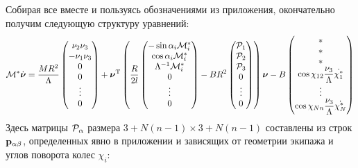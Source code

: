 Собирая все вместе и пользуясь обозначениями из приложения, окончательно получим следующую структуру уравнений:
\begin{eqnarray}\label{eq:full_system}
\mathcal{M}^*\dot{\boldsymbol{\mathbf{\nu}}} = 
\frac{MR^2}{\Lambda}\left(\begin{matrix}
    \nu_2\nu_3\\
    -\nu_1\nu_3\\
    0\\
    0\\
    \vdots
    \\
    0
\end{matrix}\right)
+\boldsymbol{\mathbf{\nu}}^\mathrm{T}\left(
\frac{R}{2l}
\left(\begin{matrix}
    -\sin\alpha_i \mathcal{M}^*_i\\
    \cos\alpha_i \mathcal{M}^*_i\\
    \Lambda^{-1}\mathcal{M}^*_i\\
    0\\
    \vdots
    \\
    0
    \end{matrix}
\right)
-BR^2
\left(\begin{matrix}
    \mathcal{P}_1\\
    \mathcal{P}_2\\
    \mathcal{P}_3\\
    0\\
    \vdots
    \\
    0
\end{matrix}\right)
\right)
\boldsymbol{\mathbf{\nu}}
-B\left(\begin{matrix}
    *\\
    *\\
    *\\
    \cos\chi_{12}\displaystyle\frac{\displaystyle \nu_3}{\displaystyle \Lambda}\dot{\chi_1^*}\\
    \vdots
    \\
    \cos\chi_{Nn}\displaystyle\frac{\displaystyle \nu_3}{\displaystyle \Lambda}\dot{\chi_N^*}
\end{matrix}\right)
\end{eqnarray}
Здесь матрицы $\mathcal{P}_\alpha$ размера $3+N(n-1)\times3+N(n-1)$ составлены из строк $\mathbf{p}_{\alpha\beta}$, определенных явно в приложении и зависящих от геометрии экипажа и углов поворота колес $\chi_i$:
